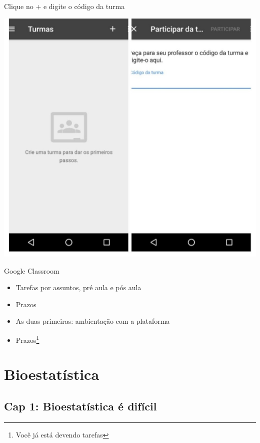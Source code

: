 \documentclass{beamer}
\begin{document}
\begin{frame}{\scriptsize Clique no + e digite o código da turma}
  \begin{center}
    \includegraphics[height=\textheight]{Cap1/gclassroom-turma}
  \end{center}
\end{frame}

\begin{frame}{\scriptsize Google Classroom}
  \begin{itemize}
    \footnotesize
  \item Tarefas por assuntos, pré aula e pós aula
  \item Prazos
  \item As duas primeiras: ambientação com a plataforma
  \item Prazos\footnote{Você já está devendo tarefas}
  \end{itemize}
\end{frame}

\section{Bioestatística}

\subsection{Cap 1: Bioestatística é difícil}
\end{document}
